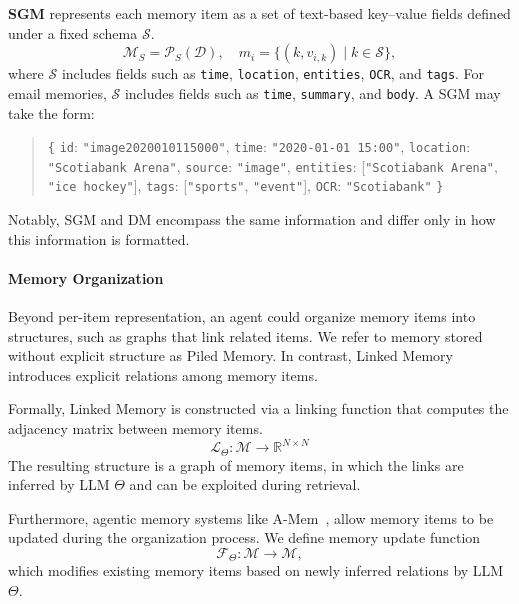 \documentclass{article}
\theoremstyle{plain}
\theoremstyle{definition}
\theoremstyle{remark}
\begin{document}
\textbf{SGM} represents each memory item as a set of text-based key–value fields defined under a fixed schema $\mathcal{S}$.
\begin{equation}
   \mathcal{M}_S = \mathcal{P}_S(\mathcal{D}), \quad m_i = \{(k, v_{i,k}) \mid k \in \mathcal{S}\},
\label{eq:schema}
\end{equation}
where $\mathcal{S}$ includes fields such as \texttt{time}, \texttt{location}, \texttt{entities}, \texttt{OCR}, and \texttt{tags}. For email memories, $\mathcal{S}$ includes fields such as \texttt{time}, \texttt{summary}, and \texttt{body}.
A SGM may take the form:
\begin{quote}
\small
\texttt{\{}
\texttt{id}: \texttt{"image2020010115000"},\;
\texttt{time}: \texttt{"2020-01-01 15:00"},\;
\texttt{location}: \texttt{"Scotiabank Arena"},\;
\texttt{source}: \texttt{"image"},\;
\texttt{entities}: [\texttt{"Scotiabank Arena"}, \texttt{"ice hockey"}],\;
\texttt{tags}: [\texttt{"sports"}, \texttt{"event"}],\;
\texttt{OCR}: \texttt{"Scotiabank"}
\texttt{\}}
\end{quote}
Notably, SGM and DM encompass the same information and differ only in how this information is formatted.

\paragraph{Memory Organization}
Beyond per-item representation, an agent could organize memory items into structures, such as graphs that link related items. We refer to memory stored without explicit structure as Piled Memory. In contrast, Linked Memory introduces explicit relations among memory items.

Formally, Linked Memory is constructed via a linking function that computes the adjacency matrix between memory items.
\begin{equation}
\mathcal{L}_\Theta:\mathcal{M} \rightarrow \mathbb{R}^{N \times N}
\end{equation} 
The resulting structure is a graph of memory items, in which the links are inferred by LLM $\Theta$ and can be exploited during retrieval.

Furthermore, agentic memory systems like A-Mem~\citep{xu2025amem}, allow memory items to be updated during the organization process. We define memory update function
\begin{equation}
\mathcal{F}_\Theta:\mathcal{M} \rightarrow \mathcal{M},
\end{equation}
which modifies existing memory items based on newly inferred relations by LLM $\Theta$.
\end{document}
